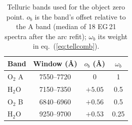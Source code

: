 \begin{table}
\centering
\caption{Telluric bands used for the object zero point. $o_b$ is the band's offset relative to the A band
(median of 18 EG\,21 spectra after the arc refit); $\omega_b$ its weight in eq.~(\ref{eq:tellcomb}).}
\label{tab:bands}
\begin{tabular}{lccc}
\toprule
Band & Window (\AA) & $o_b$ (\AA) & $\omega_b$ \\
\midrule
O$_2$ A & 7550--7720 & 0 & 1 \\
H$_2$O & 7150--7350 & $+5.05$ & 0.5 \\
O$_2$ B & 6840--6960 & $+0.56$ & 0.5 \\
H$_2$O & 9250--9700 & $+0.53$ & 0.25 \\
\bottomrule
\end{tabular}
\end{table}
